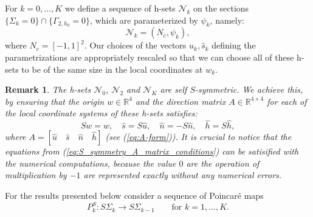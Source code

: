 \documentclass[1p]{article}
\newtheorem{remark}{Remark}
\begin{document}
For $k=0,\ldots,K$ we define a sequence of h-sets $\mathcal{N}_k$ on the sections $\{ \Sigma_k = 0 \} \cap \{\Gamma_{2,h_0}=0\}$, which are parameterized by $\psi_k$, namely:
\begin{equation}
    \label{eq:N_k}
    \mathcal{N}_k = (N_c, \psi_k),    
\end{equation}
where $N_c = [-1,1]^2$. Our choices of the vectors $\hat{u}_k, \hat{s}_k$ defining the parametrizations are appropriately rescaled so that we can choose all of these h-sets to be of the same size in the local coordinates at $w_k$.

\begin{remark}
    The h-sets $\mathcal{N}_0$, $\mathcal{N}_2$ and $\mathcal{N}_K$ are self $S$-symmetric. We achieve this, by ensuring that the origin $w \in \mathbb{R}^4$ and the direction matrix $A \in\mathbb{R}^{4 \times 4}$ for each of the local coordinate systems of these h-sets satisfies:
    \begin{equation}
        \label{eq:S_symmetry_A_matrix_conditions}
        Sw = w,\quad \hat{s} = S\hat{u},\quad \hat{n} = -S\hat{n},\quad \hat{h} = S\hat{h},
    \end{equation}
    where $A = \left[ \hat{u} \quad \hat{s} \quad \hat{n} \quad \hat{h} \right]$ (see (\ref{eq:A-form})). It is crucial to notice that the equations from (\ref{eq:S_symmetry_A_matrix_conditions}) can be satisified with the numerical computations, because the value $0$ are the operation of multiplication by $-1$ are represented exactly without any numerical errors.
\end{remark}

For the results presented below consider a sequence of Poincar\'e maps 
\begin{equation} \label{eq:PS-maps}
P^S_k:S\Sigma_k \to S\Sigma_{k-1}  \qquad \mbox{for } k=1,\ldots,K.
\end{equation}
\end{document}
